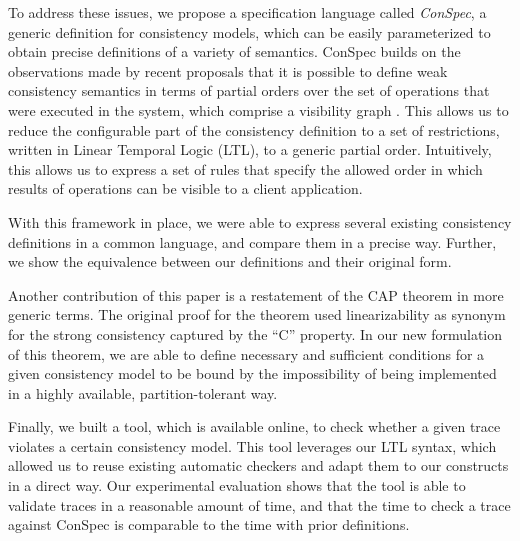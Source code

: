 \documentclass[journal,compsoc]{IEEEtran}
\begin{document}
To address these issues, we propose a specification language called
\emph{ConSpec}, a generic definition for consistency models, which can
be easily parameterized to obtain precise definitions of a variety of
semantics. ConSpec builds on the observations made by recent proposals
that it is possible to define weak consistency semantics in terms of
partial orders over the set of operations that were executed in the
system, which comprise a visibility graph 
\cite{Li:2012:MGS:2387880.2387906, Gotsman:2016:CIS:2837614.2837625, cheng-papoc}. This allows us to reduce
the configurable part of the consistency definition to a set of restrictions,
written in Linear Temporal Logic (LTL), to a generic partial order.
Intuitively, this allows us to express a set of rules that specify the allowed order in which results of operations can be visible to a client application.  


With this framework in place, we were able to express several existing
consistency definitions in a common language, and compare them in a precise
way. Further, we show the equivalence between our definitions and  their original form. %
 
Another contribution of this paper is a restatement of the CAP theorem \cite{brew:cap, Gilbert:2002:BCF:564585.564601}  in more generic terms. The original proof for the theorem used linearizability as synonym for the strong consistency captured by the ``C'' property. In our new formulation of this theorem, we are able to define necessary and sufficient conditions for a given consistency model to be bound by the impossibility of being implemented in a highly available, partition-tolerant way.

Finally, we built a tool, which is available online, to check whether a given trace violates a certain consistency model. This tool leverages our LTL syntax, which allowed us to reuse existing automatic checkers and adapt them to our constructs in a direct way.
Our experimental evaluation shows that the tool is able to validate traces in a reasonable amount of time, and that the time to check a trace against ConSpec is comparable to the time with  prior definitions.
\end{document}
